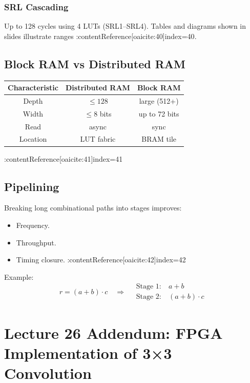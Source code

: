 \documentclass[11pt]{article}
\begin{document}
\subsubsection*{SRL Cascading}
Up to 128 cycles using 4 LUTs (SRL1--SRL4). Tables and diagrams shown in slides illustrate ranges
:contentReference[oaicite:40]{index=40}.

\subsection{Block RAM vs Distributed RAM}
\begin{center}
\begin{tabular}{|c|c|c|}
\hline
Characteristic & Distributed RAM & Block RAM \\
\hline
Depth & $\le 128$ & large (512+) \\
Width & $\le 8$ bits & up to 72 bits \\
Read & async & sync \\
Location & LUT fabric & BRAM tile \\
\hline
\end{tabular}
\end{center}
:contentReference[oaicite:41]{index=41}

\subsection{Pipelining}
Breaking long combinational paths into stages improves:
\begin{itemize}
    \item Frequency.
    \item Throughput.
    \item Timing closure. :contentReference[oaicite:42]{index=42}
\end{itemize}

Example:
\[
r = (a+b)\cdot c \quad\Rightarrow\quad
\begin{aligned}
    \text{Stage 1:}&\ a+b \\
    \text{Stage 2:}&\ (a+b)\cdot c
\end{aligned}
\]

\newpage

\section{Lecture 26 Addendum: FPGA Implementation of 3×3 Convolution}
\end{document}
